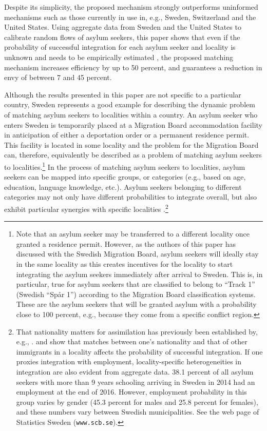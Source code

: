 \documentclass[12pt,fleqn]{article}
\begin{document}
Despite its simplicity, the proposed mechanism strongly outperforms uninformed mechanisms such as those currently in use in, e.g., Sweden, Switzerland and the United States. Using aggregate data from Sweden and the United States to calibrate random flows of asylum seekers, this paper shows that even if the probability of successful integration for each asylum seeker and locality is unknown and needs to be empirically estimated \citep[as in][]{bib:BansakEtAl}, the proposed matching mechanism increases efficiency by up to 50 percent, and guarantees a reduction in envy of between 7 and 45 percent.

Although the results presented in this paper are not specific to a particular country, Sweden represents a good example for describing the dynamic problem of matching asylum seekers to localities within a country. An asylum seeker who enters Sweden is temporarily placed at a Migration Board accommodation facility in anticipation of either a deportation order or a permanent residence permit. This facility is located in some locality and the problem for the Migration Board can, therefore, equivalently be described as a problem of matching asylum seekers to localities.\footnote{Note that an asylum seeker may be transferred to a different locality once granted a residence permit. However, as the authors of this paper has discussed with the Swedish Migration Board, asylum seekers will ideally stay in the same locality as this creates incentives for the locality to start integrating the asylum seekers immediately after arrival to Sweden. This is, in particular, true for asylum seekers that are classified to belong to ``Track 1'' (Swedish ``Sp\aa r 1'') according to the Migration Board classification systems. These are the asylum seekers that will be granted asylum with a probability close to 100 percent, e.g., because they come from a specific conflict region.} In the process of matching asylum seekers to localities, asylum seekers can be mapped into specific groups, or categories (e.g., based on age, education, language knowledge, etc.). Asylum seekers belonging to different categories may not only have different probabilities to integrate overall, but also exhibit particular synergies with specific localities \citep{bib:BansakEtAl}.\footnote{That nationality matters for assimilation has previously been established by, e.g., \citet{bib:RanEtAl}. \citet{bib:EdinEtAl} and \citet{bib:Damm} show that matches between one's nationality and that of other immigrants in a locality affects the probability of successful integration. If one proxies integration with employment,  locality-specific heterogeneities in integration are also evident from aggregate data. 38.1 percent of all asylum seekers with more than 9 years schooling arriving in Sweden in 2014 had an employment at the end of 2016. However, employment probability in this group varies by gender (45.3 percent for males and 25.8 percent for females), and these numbers vary between Swedish municipalities. See the web page of Statistics Sweden (\texttt{www.scb.se}).}
\end{document}
